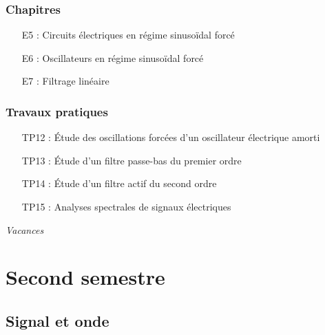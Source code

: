 \documentclass[a4paper, 10pt, final, garamond]{book}
\begin{document}
\begin{multicols}{2}
	\subsubsection{Chapitres}

	\begin{itemize}[label=$\diamond$]
		\item[E5]: Circuits électriques en régime sinusoïdal forcé
		\item[E6]: Oscillateurs en régime sinusoïdal forcé
		\item[E7]: Filtrage linéaire
	\end{itemize}

	\columnbreak

	\subsubsection{Travaux pratiques}

	\begin{itemize}[label=$\diamond$]
		\item[TP12]: Étude des oscillations forcées d'un oscillateur électrique amorti
		\item[TP13]: Étude d'un filtre passe-bas du premier ordre
		\item[TP14]: Étude d'un filtre actif du second ordre
		\item[TP15]: Analyses spectrales de signaux électriques
	\end{itemize}
\end{multicols}

\begin{center}
	\textit{\Large Vacances}
\end{center}

\newpage

\section{Second semestre}

\subsection{Signal et onde}
\end{document}
